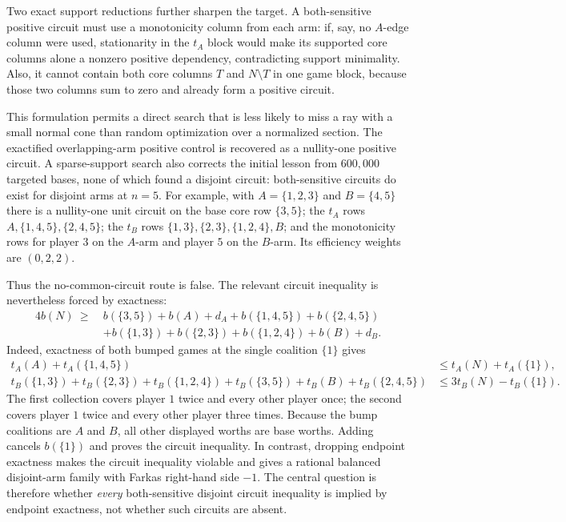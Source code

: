 \documentclass[11pt]{article}
\begin{document}
Two exact support reductions further sharpen the target.  A both-sensitive
positive circuit must use a monotonicity column from each arm: if, say, no
$A$-edge column were used, stationarity in the $t_A$ block would make its
supported core columns alone a nonzero positive dependency, contradicting
support minimality.  Also, it cannot contain both core columns $T$ and
$N\setminus T$ in one game block, because those two columns sum to zero and
already form a positive circuit.

This formulation permits a direct search that is less likely to miss a ray
with a small normal cone than random optimization over a normalized section.
The exactified overlapping-arm positive control is recovered as a nullity-one
positive circuit.  A sparse-support search also corrects the initial lesson
from $600{,}000$ targeted bases, none of which found a disjoint circuit:
both-sensitive circuits do exist for disjoint arms at $n=5$.  For example,
with $A=\{1,2,3\}$ and $B=\{4,5\}$ there is a nullity-one unit circuit on
the base core row $\{3,5\}$; the $t_A$ rows
$A,\{1,4,5\},\{2,4,5\}$; the $t_B$ rows
$\{1,3\},\{2,3\},\{1,2,4\},B$; and the monotonicity rows for player $3$
on the $A$-arm and player $5$ on the $B$-arm.  Its efficiency weights are
$(0,2,2)$.

Thus the no-common-circuit route is false.  The relevant circuit inequality is
nevertheless forced by exactness:
\begin{align*}
4b(N)\ \geq\ &b(\{3,5\})+b(A)+d_A+b(\{1,4,5\})+b(\{2,4,5\})\\
&+b(\{1,3\})+b(\{2,3\})+b(\{1,2,4\})+b(B)+d_B.
\end{align*}
Indeed, exactness of both bumped games at the single coalition $\{1\}$ gives
\begin{align*}
 t_A(A)+t_A(\{1,4,5\})
 &\leq t_A(N)+t_A(\{1\}),\\
 t_B(\{1,3\})+t_B(\{2,3\})+t_B(\{1,2,4\})
 +t_B(\{3,5\})+t_B(B)+t_B(\{2,4,5\})
 &\leq 3t_B(N)-t_B(\{1\}).
\end{align*}
The first collection covers player $1$ twice and every other player once;
the second covers player $1$ twice and every other player three times.
Because the bump coalitions are $A$ and $B$, all other displayed worths are
base worths. Adding cancels $b(\{1\})$ and proves the circuit inequality.
In contrast, dropping endpoint exactness makes the circuit inequality
violable and gives a rational balanced disjoint-arm family with Farkas
right-hand side $-1$. The central question is therefore whether \emph{every}
both-sensitive disjoint circuit inequality is implied by endpoint exactness,
not whether such circuits are absent.
\end{document}
